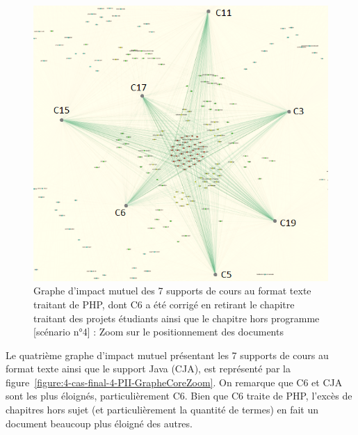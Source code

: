 \begin{figure}[htb!]
\centering
\centerline{  %
\includegraphics[scale=0.8]{4-Experiences/images/cas-final/3-Full-Text-noC+noP-PHP_core-courses-written.png}
}
\caption{Graphe d'impact mutuel des 7 supports de cours au format texte traitant de PHP, dont C6 a été corrigé en retirant le chapitre traitant des projets étudiants ainsi que le chapitre hors programme [scénario n°4] : Zoom sur le positionnement des documents}
\label{figure:4-cas-final-3-PII-GrapheCoreZoom}
\end{figure}

\hspace{0pt}
\vfill

\clearpage

Le quatrième graphe d'impact mutuel présentant les 7 supports de cours au format texte ainsi que le support Java (CJA), est représenté par la figure~\ref{figure:4-cas-final-4-PII-GrapheCoreZoom}.
On remarque que C6 et CJA sont les plus éloignés, particulièrement C6.
Bien que C6 traite de PHP, l'excès de chapitres hors sujet (et particulièrement la quantité de termes) en fait un document beaucoup plus éloigné des autres.

\vfill
\hspace{0pt}

